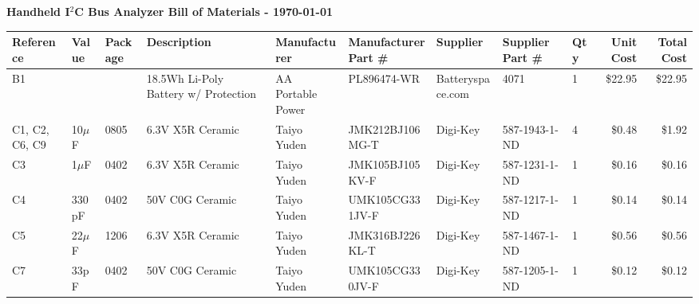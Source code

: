 \documentclass{article}
\begin{document}
  \pagestyle{empty}
  \begin{center}
    \textbf{Handheld I$^2$C Bus Analyzer Bill of Materials - \today}

    \vspace{10pt}

    \begin{tabular}{| l | l | l | l | l | l | l | l | l | r | r |}
      \hline
      \textbf{Reference}      &  \textbf{Value}  &  \textbf{Package}  &  \textbf{Description}                     &  \textbf{Manufacturer}  &  \textbf{Manufacturer Part \#}  &  \textbf{Supplier}  &  \textbf{Supplier Part \#}   &  \textbf{Qty}  &  \textbf{Unit Cost}  &  \textbf{Total Cost} \\
      \hline
      B1                      &                  &                    &  18.5Wh Li-Poly Battery w/ Protection     &  AA Portable Power      &  PL896474-WR                    &  Batteryspace.com   &  4071                        &  1             &  \$22.95             &  \$22.95 \\
      \hline
      C1, C2, C6, C9          &  10$\mu$F        &  0805              &  6.3V X5R Ceramic                         &  Taiyo Yuden            &  JMK212BJ106MG-T                &  Digi-Key           &  587-1943-1-ND               &  4             &  \$0.48              &  \$1.92 \\
      \hline
      C3                      &  1$\mu$F         &  0402              &  6.3V X5R Ceramic                         &  Taiyo Yuden            &  JMK105BJ105KV-F                &  Digi-Key           &  587-1231-1-ND               &  1             &  \$0.16              &  \$0.16 \\
      \hline
      C4                      &  330pF           &  0402              &  50V C0G Ceramic                          &  Taiyo Yuden            &  UMK105CG331JV-F                &  Digi-Key           &  587-1217-1-ND               &  1             &  \$0.14              &  \$0.14 \\
      \hline
      C5                      &  22$\mu$F        &  1206              &  6.3V X5R Ceramic                         &  Taiyo Yuden            &  JMK316BJ226KL-T                &  Digi-Key           &  587-1467-1-ND               &  1             &  \$0.56              &  \$0.56 \\
      \hline
      C7                      &  33pF            &  0402              &  50V C0G Ceramic                          &  Taiyo Yuden            &  UMK105CG330JV-F                &  Digi-Key           &  587-1205-1-ND               &  1             &  \$0.12              &  \$0.12 \\

\end{tabular}
\end{center}
\end{document}
